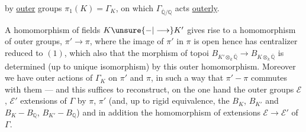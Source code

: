 by \uline{outer}  groups $\pi_1(K)=\Gamma_K$, on which  $\Gamma_{\overline{\mathbb Q}/\mathbb Q}$ acts \uline{outerly}.

A homomorphism of fields $K\unsure{-|\longrightarrow}K'$ gives rise to a homomorphism of outer groups,
 $\pi'\longrightarrow\pi$, where the image of $\pi'$ in $\pi$ is open hence has centralizer reduced to $(1)$, which also  that the morphism of topoi $B_{K'\otimes_k\overline{\mathbb Q}}\longrightarrow B_{K\otimes_k\overline{\mathbb Q}}$ is determined (up to unique isomorphism) by this outer homomorphism. Moreover we have outer actions of \inserted{$\Gamma=$}$\Gamma_K$ on $\pi'$ and $\pi$, in such a way that $\pi'-\pi$ commutes with them --- and this suffices to reconstruct, on the one hand the outer groups $\mathcal E$, $\mathcal E'$ extensions  of $\Gamma$ by $\pi$, $\pi'$ (and, up to rigid equivalence, the $B_K$, $B_{K'}$ and $B_K-B_{\mathbb Q}$, $B_{K'}-B_{\mathbb Q}$) and in addition the homomorphism of  extensions $\mathcal E\longrightarrow\mathcal E'$ of $\Gamma$.
